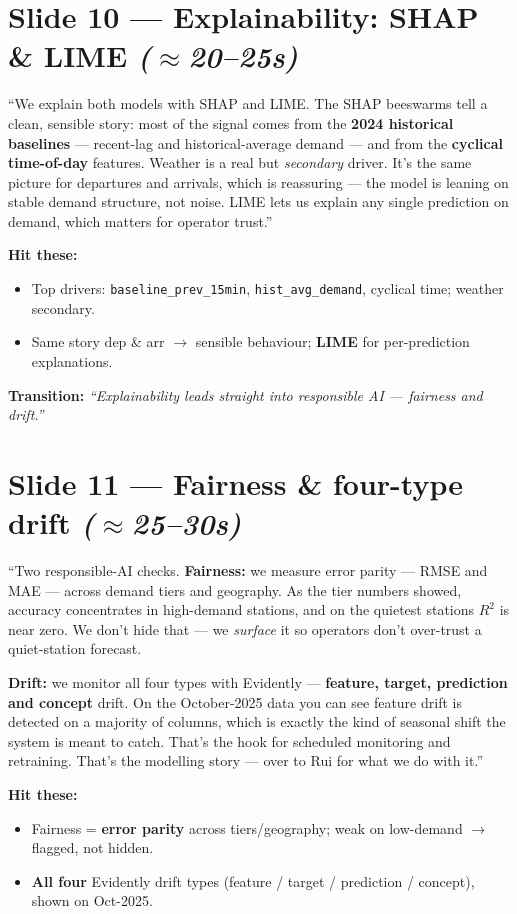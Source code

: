 \documentclass[11pt]{article}
\newcommand{\arr}{$\rightarrow$}
\newcommand{\Rtwo}{$R^2$}
\newcommand{\approxx}{$\approx$}
\newcommand{\timing}[1]{\hfill{\normalsize\itshape\color{slate}(#1)}}
\newcommand{\hit}{\smallskip\noindent\textbf{\color{ink}Hit these:}}
\newcommand{\trans}[1]{\smallskip\noindent\textbf{\color{bixired}Transition:} \emph{#1}}
\begin{document}
\section{Slide 10 --- Explainability: SHAP \& LIME \timing{\approxx 20--25s}}
\begin{say}
``We explain both models with SHAP and LIME. The SHAP beeswarms tell a clean, sensible story: most of the
signal comes from the \textbf{2024 historical baselines} --- recent-lag and historical-average demand ---
and from the \textbf{cyclical time-of-day} features. Weather is a real but \emph{secondary} driver. It's
the same picture for departures and arrivals, which is reassuring --- the model is leaning on stable
demand structure, not noise. LIME lets us explain any single prediction on demand, which matters for
operator trust.''
\end{say}
\hit
\begin{itemize}
  \item Top drivers: \texttt{baseline\_prev\_15min}, \texttt{hist\_avg\_demand}, cyclical time; weather secondary.
  \item Same story dep \& arr \arr{} sensible behaviour; \textbf{LIME} for per-prediction explanations.
\end{itemize}
\trans{``Explainability leads straight into responsible AI --- fairness and drift.''}

\section{Slide 11 --- Fairness \& four-type drift \timing{\approxx 25--30s}}
\begin{say}
``Two responsible-AI checks. \textbf{Fairness:} we measure error parity --- RMSE and MAE --- across demand
tiers and geography. As the tier numbers showed, accuracy concentrates in high-demand stations, and on the
quietest stations \Rtwo{} is near zero. We don't hide that --- we \emph{surface} it so operators don't
over-trust a quiet-station forecast.

\textbf{Drift:} we monitor all four types with Evidently --- \textbf{feature, target, prediction and
concept} drift. On the October-2025 data you can see feature drift is detected on a majority of columns,
which is exactly the kind of seasonal shift the system is meant to catch. That's the hook for scheduled
monitoring and retraining. That's the modelling story --- over to Rui for what we do with it.''
\end{say}
\hit
\begin{itemize}
  \item Fairness = \textbf{error parity} across tiers/geography; weak on low-demand \arr{} flagged, not hidden.
  \item \textbf{All four} Evidently drift types (feature / target / prediction / concept), shown on Oct-2025.
\end{itemize}
\end{document}
